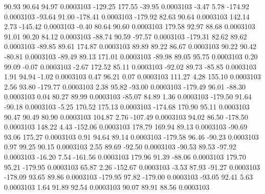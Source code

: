        90.93       90.64       94.97     0.0003103
     -129.25      177.55      -39.95     0.0003103
       -3.47        5.78     -174.92     0.0003103
      -93.64       91.00     -178.41     0.0003103
     -179.92       82.63       90.64     0.0003103
      142.14        2.73     -145.42     0.0003103
       -0.40       80.64       90.60     0.0003103
      179.58       92.97       88.68     0.0003103
       91.01       90.20       84.12     0.0003103
      -88.74       90.59      -97.57     0.0003103
     -179.31       82.62       89.62     0.0003103
      -89.85       89.61      174.87     0.0003103
       89.89       89.22       86.67     0.0003103
       90.22       90.42      -80.81     0.0003103
      -89.49       89.13      171.01     0.0003103
      -89.98       89.05       95.75     0.0003103
        0.20       99.09       -0.07     0.0003103
       -2.67      172.52       85.11     0.0003103
      -92.02       89.73      -85.85     0.0003103
        1.91       94.94       -1.02     0.0003103
        0.47       96.21        0.07     0.0003103
      111.27        4.28      155.10     0.0003103
        2.56       93.80     -179.77     0.0003103
        2.38       95.82      -93.00     0.0003103
     -179.49       96.01      -88.30     0.0003103
        0.04       80.27       89.99     0.0003103
      -85.07       84.89        1.36     0.0003103
     -179.50       91.64      -90.18     0.0003103
       -5.25      170.52      175.13     0.0003103
     -174.68      170.90       95.11     0.0003103
       90.47       90.49       80.90     0.0003103
      104.87        2.76     -107.49     0.0003103
       94.02       86.50     -178.50     0.0003103
      148.22        4.43     -152.06     0.0003103
      178.79      169.94       89.13     0.0003103
      -90.69       93.06      175.27     0.0003103
        0.91       94.64       89.14     0.0003103
     -179.58       96.46      -90.23     0.0003103
        0.97       99.25       90.15     0.0003103
        2.55       89.69      -92.50     0.0003103
      -90.53       89.53      -97.92     0.0003103
      -16.20        7.54     -161.56     0.0003103
      179.96       91.39      -88.06     0.0003103
      179.70       95.21     -179.95     0.0003103
       65.87        2.26     -152.67     0.0003103
       -3.53       87.93      -91.27     0.0003103
     -178.09       93.65       89.86     0.0003103
     -179.95       97.82     -179.00     0.0003103
      -93.05       92.41        5.63     0.0003103
        1.64       91.89       92.54     0.0003103
       90.07       89.91       88.56     0.0003103
